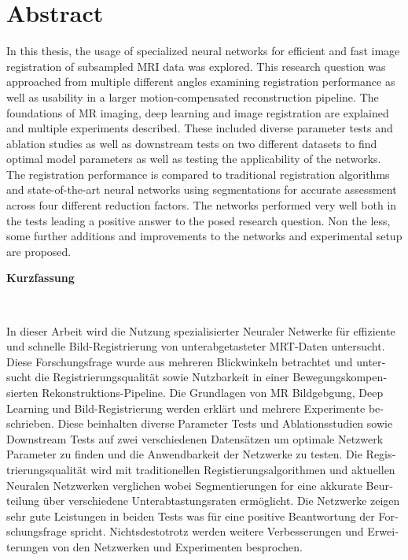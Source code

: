 \chapter*{Abstract}
In this thesis, the usage of specialized neural networks for efficient and fast image registration of subsampled MRI data was explored. This research question was approached from multiple different angles examining registration performance as well as usability in a larger motion-compensated reconstruction pipeline. The foundations of MR imaging, deep learning and image registration are explained and multiple experiments described. These included diverse parameter tests and ablation studies as well as downstream tests on two different datasets to find optimal model parameters as well as testing the applicability of the networks. The registration performance is compared to traditional registration algorithms and state-of-the-art neural networks using segmentations for accurate assessment across four different reduction factors. The networks performed very well both in the tests leading a positive answer to the posed research question. Non the less, some further additions and improvements to the networks and experimental setup are proposed.

\vspace*{1.5cm}
\begin{Huge}
\noindent \textbf{Kurzfassung}
\end{Huge}
\chapterheadstartvskip \\
\begin{otherlanguage}{ngerman}
In dieser Arbeit wird die Nutzung spezialisierter Neuraler Netwerke für effiziente und schnelle Bild-Registrierung von unterabgetasteter MRT-Daten untersucht. Diese Forschungsfrage wurde aus mehreren Blickwinkeln betrachtet und untersucht die Registrierungsqualität sowie Nutzbarkeit in einer Bewegungskompensierten Rekonstruktions-Pipeline. Die Grundlagen von MR Bildgebgung, Deep Learning und Bild-Registrierung werden erklärt und mehrere Experimente beschrieben. Diese beinhalten diverse Parameter Tests und Ablationsstudien sowie Downstream Tests auf zwei verschiedenen Datensätzen um optimale Netzwerk Parameter zu finden und die Anwendbarkeit der Netzwerke zu testen. Die Registrierungsqualität wird mit traditionellen Registierungsalgorithmen und aktuellen Neuralen Netzwerken verglichen  wobei Segmentierungen for eine akkurate Beurteilung über verschiedene Unterabtastungsraten ermöglicht. Die Netzwerke zeigen sehr gute Leistungen in beiden Tests was für eine positive Beantwortung der Forschungsfrage spricht. Nichtsdestotrotz werden weitere Verbesserungen und Erweiterungen von den Netzwerken und Experimenten besprochen.
\end{otherlanguage}